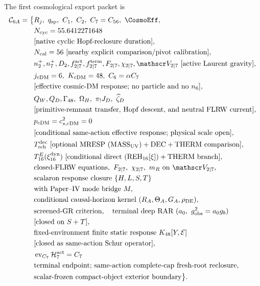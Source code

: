 \documentclass[12pt,a4paper]{article}
\begin{document}
The first cosmological export packet is
\begin{equation}
\label{p8:eq:first-split-export-packet}
\begin{aligned}
\mathcal C_{6A}
=\bigl\{&R_j,\ q_{\rm sp},\ C_1,\ C_2,\ C_7=C_{56},\ \CosmoEff,\\
&N_{\rm cyc}=55.6412271648\\
&\text{[native cyclic Hopf-reclosure duration]},\\
&N_{\rm cal}=56\ \text{[nearby explicit comparison/pivot calibration]},\\
&n_2^+,n_7^+,D_2,f_{2\mid7}^{\rm act},f_{2\mid7}^{\rm term},F_{2\mid7},\chi_{2\mid7},\mathscr V_{2\mid7}
  \ \text{[active Laurent gravity]},\\
&j_{\rm cDM}=6,\ K_{\rm cDM}=48,\ C_6=\alpha C_7\\
&\text{[effective cosmic-DM response; no particle and no }n_6\text{]},\\
&Q_W,Q_D,\Gamma_{48},\ \Omega_H,\ \pi_!J_D,\ \widehat\zeta_D\\
&\text{[primitive-remnant transfer, Hopf descent, and neutral FLRW current]},\\
&p_{\rm cDM}=c_{s,\rm cDM}^2=0\\
&\text{[conditional same-action effective response; physical scale open]},\\
&T_{\rm reh}^{\rm dec}\ \text{[optional MRESP }(\mathrm{MASS}_{\rm UV})
  +\mathrm{DEC}+\mathrm{THERM}\text{ comparison]},\\
&T_{16}^{E}(\xi_{16}^{\rm dyn})\ \text{[conditional direct }
  (\mathrm{REH}_{16}[\xi])+\mathrm{THERM}\text{ branch]},\\
&\text{closed-FLRW equations},\ F_{2\mid7},\ \chi_{2\mid7},\ m_R
  \text{ on }\mathscr V_{2\mid7},\\
&\text{scalaron response closure }\{H,L,S,T\}\\
&\text{with Paper--IV mode bridge }M,\\
&\text{conditional causal-horizon kernel }(R_A,\Theta_A,G_A,\rho_{\rm DE}),\\
&\text{screened-GR criterion},\quad
\text{terminal deep RAR }(a_0,\ g_{\rm obs}^2=a_0g_b)\\
&\text{[closed on }S+T\text{]},\\
&\text{fixed-environment finite static response }K_{48}[Y,\mathcal E]\\
&\text{[closed as same-action Schur operator]},\\
&\operatorname{ev}_{C_7}\mathcal H_7^{\rm act}=C_7\\
&\text{terminal endpoint; same-action complete-cap fresh-root reclosure},\\
&\text{scalar-frozen compact-object exterior boundary}\bigr\}.
\end{aligned}
\end{equation}
\end{document}
